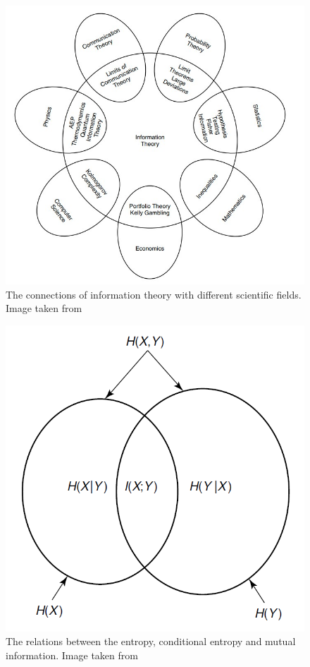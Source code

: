 \documentclass[12pt,%
               a4paper,%
               oneside,openany,%
               titlepage,%
               headinclude,footinclude,%
               BCOR5mm,%
               cleardoublepage=empty,%
               tablecaptionabove,%
               floatperchapter,
               ]{scrreprt}                 %
\begin{document}
\begin{figure}[h]
\begin{center}
\includegraphics[width=1\textwidth]{Figures/Information_theory_connections.jpg}
\caption{The connections of information theory with different scientific fields. Image taken from \cite{cover2006elements}}
\label{Information_theory_connections}
\end{center}
\end{figure}

\begin{figure}[h]
\begin{center}
\includegraphics[width=1\textwidth]{Figures/Entropy_MI.png}
\caption{The relations between the entropy, conditional entropy and mutual information. Image taken from \cite{cover2006elements}}
\label{Entropy_MI}
\end{center}
\end{figure}
\end{document}
